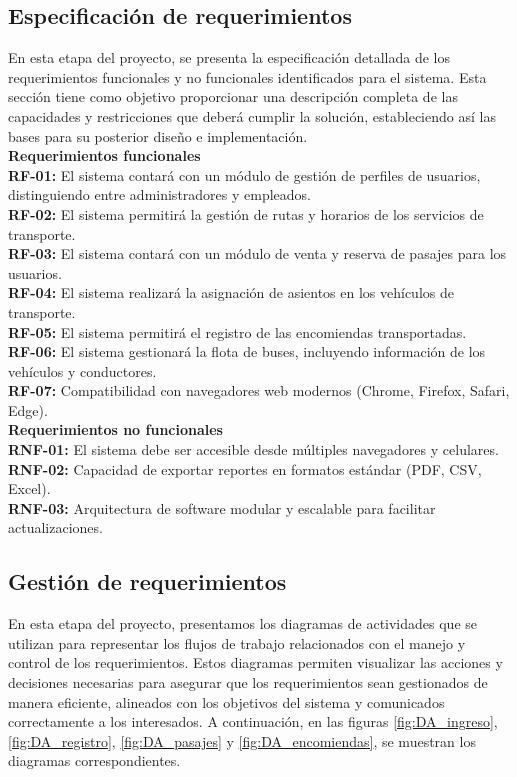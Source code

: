 	\endgroup 
	\vspace{-6pt}  %
		
	\subsection{Especificación de requerimientos}
	En esta etapa del proyecto, se presenta la especificación detallada de los requerimientos funcionales y no funcionales identificados para el sistema. Esta sección tiene como objetivo proporcionar una descripción completa de las capacidades y restricciones que deberá cumplir la solución, estableciendo así las bases para su posterior diseño e implementación.\\
	\textbf{Requerimientos funcionales} \\		
	\textbf{RF-01:} El sistema contará con un módulo de gestión de perfiles de usuarios, distinguiendo entre administradores y empleados. \\	
	\textbf{RF-02:} El sistema permitirá la gestión de rutas y horarios de los servicios de transporte. \\	
	\textbf{RF-03:} El sistema contará con un módulo de venta y reserva de pasajes para los usuarios. \\	
	\textbf{RF-04:} El sistema realizará la asignación de asientos en los vehículos de transporte. \\	
	\textbf{RF-05:} El sistema permitirá el registro de las encomiendas transportadas. \\	
	\textbf{RF-06:} El sistema gestionará la flota de buses, incluyendo información de los vehículos y conductores. \\	
	\textbf{RF-07:} Compatibilidad con navegadores web modernos (Chrome, Firefox, Safari, Edge).\\
	\textbf{Requerimientos no funcionales} \\	
	\textbf{RNF-01:} El sistema debe ser accesible desde múltiples navegadores y celulares. \\	
	\textbf{RNF-02:} Capacidad de exportar reportes en formatos estándar (PDF, CSV, Excel). \\	
	\textbf{RNF-03:} Arquitectura de software modular y escalable para facilitar actualizaciones.
		
	\subsection{Gestión de requerimientos}
	En esta etapa del proyecto, presentamos los diagramas de actividades que se utilizan para representar los flujos de trabajo relacionados con el manejo y control de los requerimientos. Estos diagramas permiten visualizar las acciones y decisiones necesarias para asegurar que los requerimientos sean gestionados de manera eficiente, alineados con los objetivos del sistema y comunicados correctamente a los interesados. A continuación, en las figuras \ref{fig:DA_ingreso}, \ref{fig:DA_registro}, \ref{fig:DA_pasajes} y \ref{fig:DA_encomiendas}, se muestran los diagramas correspondientes.

